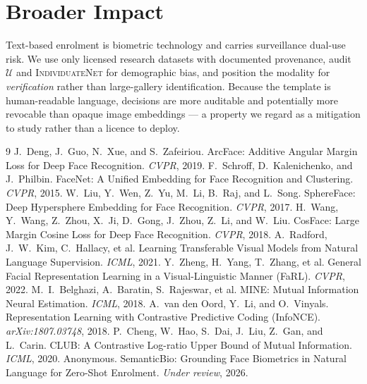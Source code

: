 \documentclass[10pt,twocolumn,letterpaper]{article}
\newcommand{\U}{\mathcal{U}}
\newcommand{\method}{\textsc{IndividuateNet}}
\begin{document}
\section{Broader Impact}
\label{sec:impact}
Text-based enrolment is biometric technology and carries surveillance dual-use risk. We use only
licensed research datasets with documented provenance, audit $\U$ and \method{} for demographic
bias, and position the modality for \emph{verification} rather than large-gallery identification.
Because the template is human-readable language, decisions are more auditable and potentially
more revocable than opaque image embeddings --- a property we regard as a mitigation to study
rather than a licence to deploy.

\begin{thebibliography}{9}\small
{} J.~Deng, J.~Guo, N.~Xue, and S.~Zafeiriou.
  ArcFace: Additive Angular Margin Loss for Deep Face Recognition. \emph{CVPR}, 2019.
 F.~Schroff, D.~Kalenichenko, and J.~Philbin.
  FaceNet: A Unified Embedding for Face Recognition and Clustering. \emph{CVPR}, 2015.
 W.~Liu, Y.~Wen, Z.~Yu, M.~Li, B.~Raj, and L.~Song.
  SphereFace: Deep Hypersphere Embedding for Face Recognition. \emph{CVPR}, 2017.
 H.~Wang, Y.~Wang, Z.~Zhou, X.~Ji, D.~Gong, J.~Zhou, Z.~Li, and W.~Liu.
  CosFace: Large Margin Cosine Loss for Deep Face Recognition. \emph{CVPR}, 2018.
 A.~Radford, J.~W.~Kim, C.~Hallacy, et al.
  Learning Transferable Visual Models from Natural Language Supervision. \emph{ICML}, 2021.
 Y.~Zheng, H.~Yang, T.~Zhang, et al.
  General Facial Representation Learning in a Visual-Linguistic Manner (FaRL). \emph{CVPR}, 2022.
 M.~I.~Belghazi, A.~Baratin, S.~Rajeswar, et al.
  MINE: Mutual Information Neural Estimation. \emph{ICML}, 2018.
 A.~van den Oord, Y.~Li, and O.~Vinyals.
  Representation Learning with Contrastive Predictive Coding (InfoNCE). \emph{arXiv:1807.03748}, 2018.
 P.~Cheng, W.~Hao, S.~Dai, J.~Liu, Z.~Gan, and L.~Carin.
  CLUB: A Contrastive Log-ratio Upper Bound of Mutual Information. \emph{ICML}, 2020.
 Anonymous.
  SemanticBio: Grounding Face Biometrics in Natural Language for Zero-Shot Enrolment.
  \emph{Under review}, 2026.
\end{thebibliography}
\end{document}
